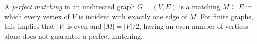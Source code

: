 
A \emph{perfect matching} in an undirected graph $G=(V,E)$ is a matching $M\subseteq E$ in which every vertex of $V$ is incident with exactly one edge of $M$. For finite graphs, this implies that $|V|$ is even and $|M|=|V|/2$; having an even number of vertices alone does not guarantee a perfect matching.
